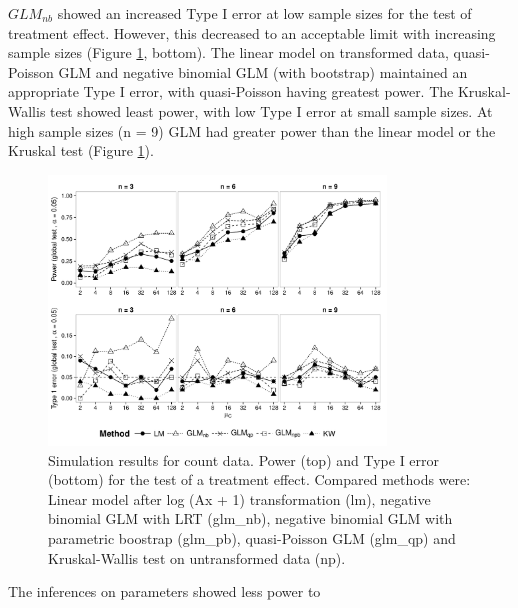 \documentclass{scrartcl}
\begin{document}
$GLM_{nb}$ showed an increased Type I error at low sample sizes for the test of treatment effect. 
However, this decreased to an acceptable limit with increasing sample sizes (Figure \ref{fig:p_glob_c}, bottom).
The linear model on transformed data, quasi-Poisson GLM and negative binomial GLM (with bootstrap) maintained an appropriate Type I error, with quasi-Poisson having greatest power.
The Kruskal-Wallis test showed least power, with low Type I error at small sample sizes. 
At high sample sizes (n = 9) GLM had greater power than the linear model or the Kruskal test (Figure \ref{fig:p_glob_c}). 

\begin{figure}
  \centering
  \includegraphics[width = 0.8\textwidth]{p_glob_c.pdf}
  \caption{Simulation results for count data. Power (top) and Type I error (bottom) for the test of a treatment effect. Compared methods were: Linear model after log (Ax + 1) transformation (lm), negative binomial GLM with LRT (glm\_nb), negative binomial GLM with parametric boostrap (glm\_pb), quasi-Poisson GLM (glm\_qp) and Kruskal-Wallis test on untransformed data (np).}
  \label{fig:p_glob_c}
\end{figure}

The inferences on parameters showed less power to 
\end{document}
